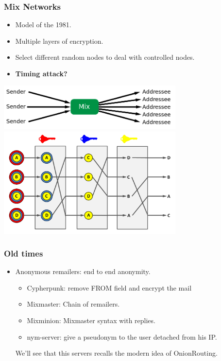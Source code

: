 \begin{frame}
	\frametitle{Mix Networks}
	\begin{minipage}{0.49\textwidth}
	\begin{itemize}
		\item Model of the 1981.
		\item Multiple layers of encryption.
		\item Select different random nodes to deal with controlled
		nodes.
		\item \textbf{Timing attack?}
	\end{itemize}
	\end{minipage}
	\begin{minipage}{0.5\textwidth}
	\begin{center}
		\includegraphics[width=0.7\textwidth]{imgs/mix_networks.png}\\
		\includegraphics[width=0.7\textwidth]{imgs/Decryption_mix_net.png}
	\end{center}
	\end{minipage}
\end{frame}

\begin{frame}
	\frametitle{Old times}
	\begin{itemize}
		\item Anonymous remailers: end to end anonymity.
		\begin{itemize}
			\item Cypherpunk: remove FROM field and encrypt the mail
			\item Mixmaster: Chain of remailers.
			\item Mixminion: Mixmaster syntax with replies.
			\item nym-server: give a pseudonym to the user detached
			from his IP.
		\end{itemize}
		We'll see that this servers recalls the modern idea of
		OnionRouting.
	\end{itemize}
\end{frame}

